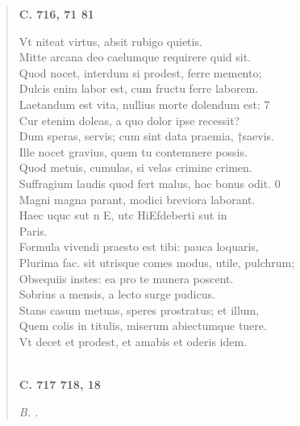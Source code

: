 \documentclass[11pt, a4paper]{report}
\begin{document}
\begin{verse}
     \marginpar{[182]} \begin{center} \textbf{C. 716, 71 81} \end{center}Vt niteat virtus, absit rubigo quietis. \\ Mitte arcana deo caelumque requirere quid sit. \\ Quod nocet, interdum si prodest, ferre memento; \\ Dulcis enim labor est, cum fructu ferre laborem. \\ Laetandum est vita, nullius morte dolendum est: 7 \\ Cur etenim doleas, a quo dolor ipse recessit? \\ Dum speras, servis; cum sint data praemia, †saevis. \\ Ille nocet gravius, quem tu contemnere possis. \\ Quod metuis, cumulas, si velas crimine crimen. \\ Suffragium laudis quod fert malus, hoc bonus odit. 0 \\ Magni magna parant, modici breviora laborant. \\ Haec uquc sut n E, utc HiEfdeberti sut in \\ Paris. \\ Formula vivendi praesto est tibi: pauca loquaris, \\ Plurima fac. sit utrisque comes modus, utile, pulchrum; \\ Obsequiis instes: ea pro te munera poscent. \\ Sobrius a mensis, a lecto surge pudicus. \\ Stans casum metuas, speres prostratus; et illum, \\ Quem colis in titulis, miserum abiectumque tuere. \\ Vt decet et prodest, et amabis et oderis idem. \\ 
        ﻿\pagebreak 
     \marginpar{[183]} \begin{center} \textbf{C. 717 718, 18} \end{center}\textit{B. .} \\ 
      \end{verse}
  
\end{document}
